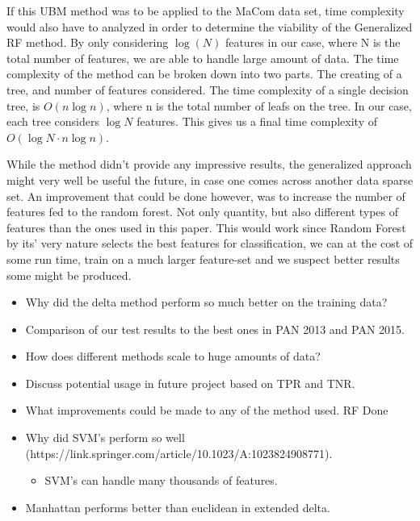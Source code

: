If this \gls{UBM} method was to be applied to the MaCom data set, 
time complexity would also have to analyzed in order to determine the viability
of the Generalized RF method. By only considering $\log(N)$ features in
our case, where N is the total number of features, we are able to handle
large amount of data. The time complexity of the method can be broken down
into two parts. The creating of a tree, and number of features considered.
The time complexity of a single decision tree, is $O(n \log{n})$, where n
is the total number of leafs on the tree. In our case, each tree considers
$\log{N}$ features. This gives us a final time complexity of $O(\log{N} \cdot n
\log{n})$.\cite{RFTime}

While the method didn't provide any impressive results, the generalized approach
might very well be useful the future, in case one comes across another data
sparse set. An improvement that could be done however, was to increase the
number of features fed to the random forest. Not only quantity, but also
different types of features than the ones used in this paper. This would
work since Random Forest by its' very nature selects the best features for
classification, we can at the cost of some run time, train on a much larger
feature-set and we suspect better results some might be produced.


\begin{itemize}
    \item Why did the delta method perform so much better on the training data?
    \item Comparison of our test results to the best ones in PAN 2013 and PAN
        2015.
    \item How does different methods scale to huge amounts of data?
    \item Discuss potential usage in future project based on TPR and TNR.
    \item What improvements could be made to any of the method used. RF Done
    \item Why did SVM's perform so well (https://link.springer.com/article/10.1023/A:1023824908771).
        \begin{itemize}
            \item SVM's can handle many thousands of features.
        \end{itemize}
    \item Manhattan performs better than euclidean in extended delta.
\end{itemize}
